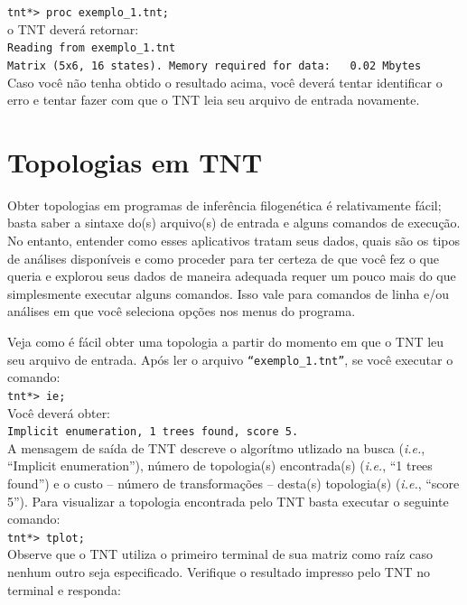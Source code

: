 \begin{refsection}
\indent\indent\texttt{tnt*> proc exemplo\_1.tnt;}\\

o TNT deverá retornar:
\\
\indent\indent\texttt{Reading from exemplo\_1.tnt}\\
\indent\indent\texttt{Matrix (5x6, 16 states). Memory required for data:~~~0.02 Mbytes}\\

Caso você não tenha obtido o resultado acima, você deverá tentar identificar o erro e tentar  fazer com que o TNT leia seu arquivo de entrada novamente.

\section{Topologias em TNT}\label{tut4:input}
Obter topologias em programas de inferência filogenética é relativamente fácil; basta saber a sintaxe do(s) arquivo(s) de entrada e alguns comandos de execução. No entanto, entender como esses aplicativos tratam seus dados, quais são os tipos de análises disponíveis e como proceder para ter certeza de que você fez o que queria e explorou seus dados de maneira adequada requer um pouco mais do que simplesmente executar alguns comandos. Isso vale para comandos de linha e/ou análises em que você seleciona opções nos menus do programa.

Veja como é fácil obter uma topologia a partir do momento em que o TNT leu seu arquivo de entrada. Após ler o arquivo \texttt{``exemplo\_1.tnt''}, se você executar o  comando:\\

\indent\indent\texttt{tnt*> ie;}\\

Você deverá obter:
\\
\indent\indent\texttt{Implicit enumeration, 1 trees found, score 5.}\\

A mensagem de saída de TNT descreve o algorítmo utlizado na busca (\textit{i.e.}, ``Implicit enumeration''), número de topologia(s) encontrada(s) (\textit{i.e.}, ``1 trees found'') e o custo -- número de transformações -- desta(s) topologia(s) (\textit{i.e.}, ``score 5''). Para visualizar a topologia encontrada pelo TNT basta executar o seguinte comando:\\

\indent\indent\texttt{tnt*> tplot;}\\

Observe que o TNT utiliza o primeiro terminal de sua matriz como raíz caso nenhum outro seja especificado. Verifique o resultado impresso pelo TNT no terminal e responda:



\end{refsection}
